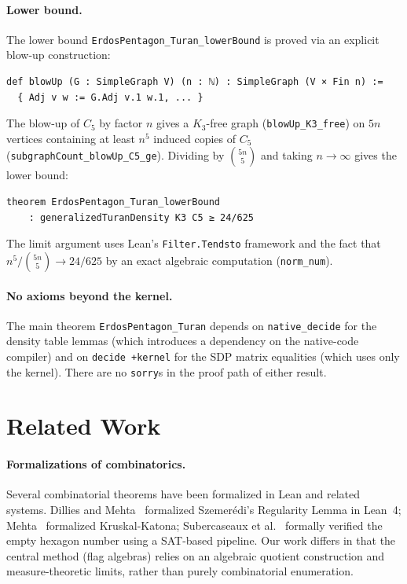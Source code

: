 \documentclass{article}
\newcommand{\lean}[1]{\texttt{#1}}
\begin{document}
\paragraph{Lower bound.}
The lower bound \lean{ErdosPentagon\_Turan\_lowerBound} is proved via an
explicit blow-up construction:
\begin{lstlisting}
def blowUp (G : SimpleGraph V) (n : ℕ) : SimpleGraph (V × Fin n) :=
  { Adj v w := G.Adj v.1 w.1, ... }
\end{lstlisting}
The blow-up of $C_5$ by factor $n$ gives a $K_3$-free graph
(\lean{blowUp\_K3\_free}) on $5n$ vertices containing at least $n^5$ induced
copies of $C_5$ (\lean{subgraphCount\_blowUp\_C5\_ge}).  Dividing by
$\binom{5n}{5}$ and taking $n\to\infty$ gives the lower bound:
\begin{lstlisting}
theorem ErdosPentagon_Turan_lowerBound
    : generalizedTuranDensity K3 C5 ≥ 24/625
\end{lstlisting}
The limit argument uses Lean's \lean{Filter.Tendsto} framework and the fact
that $n^5 / \binom{5n}{5} \to 24/625$ by an exact algebraic computation
(\lean{norm\_num}).

\paragraph{No axioms beyond the kernel.}
The main theorem \lean{ErdosPentagon\_Turan} depends on \lean{native\_decide}
for the density table lemmas (which introduces a dependency on the native-code
compiler) and on \lean{decide +kernel} for the SDP matrix equalities (which
uses only the kernel).  There are no \lean{sorry}s in the proof path of either
result.

\section{Related Work}
\label{sec:related}

\paragraph{Formalizations of combinatorics.}
Several combinatorial theorems have been formalized in Lean and related
systems.  Dillies and Mehta~\cite{dillies2022szemeredi} formalized
Szemerédi's Regularity Lemma in Lean~4; Mehta~\cite{mehta2022kruskal}
formalized Kruskal-Katona; Subercaseaux et al.~\cite{subercaseaux2024hexagon}
formally verified the empty hexagon number using a SAT-based pipeline.  Our
work differs in that the central method (flag algebras) relies on an algebraic
quotient construction and measure-theoretic limits, rather than purely
combinatorial enumeration.
\end{document}
